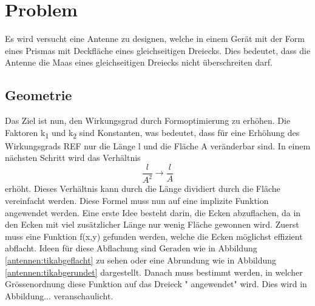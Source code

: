 %
%
% 
%
%

\section{Problem\label{antennen:problemstellung}}
 Es wird versucht eine Antenne zu designen, welche in einem Gerät mit der Form eines Prismas mit Deckfläche eines gleichseitigen Dreiecks. Dies bedeutet, dass die Antenne die Maas eines gleichseitigen Dreiecks nicht überschreiten darf.
\subsection{Geometrie\label{antennen:Geom}}
Das Ziel ist nun, den Wirkungsgrad durch Formoptimierung zu erhöhen. Die Faktoren k\textsubscript{1} und k\textsubscript{2} sind Konstanten, was bedeutet, dass für eine Erhöhung des Wirkungsgrads REF nur die Länge l und die Fläche A veränderbar sind. In einem nächsten Schritt wird das Verhältnis
\begin{equation}
	\frac{l}{A^2} \rightarrow \frac{l}{A}
	\label{antennen:Verhältnis}
\end{equation}
erhöht. Dieses Verhältnis kann durch die Länge dividiert durch die Fläche vereinfacht werden. Diese Formel muss nun auf eine implizite Funktion angewendet werden. Eine erste Idee besteht darin, die Ecken abzuflachen, da in den Ecken mit viel zusätzlicher Länge nur wenig Fläche gewonnen wird. Zuerst muss eine Funktion f(x,y) gefunden werden, welche die Ecken möglichst effizient abflacht. Ideen für diese Abflachung sind Geraden wie in Abbildung \ref{antennen:tikabgeflacht} zu sehen oder eine Abrundung wie in Abbildung \ref{antennen:tikabgerundet} dargestellt. Danach muss bestimmt werden, in welcher Grössenordnung diese Funktion auf das Dreieck " angewendet"  wird. Dies wird in Abbildung... veranschaulicht.

